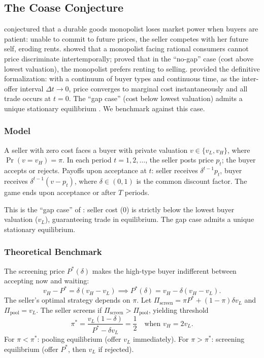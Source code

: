 \subsection{The Coase Conjecture}

\citet{coase1972durability} conjectured that a durable goods monopolist loses market power when buyers are patient: unable to commit to future prices, the seller competes with her future self, eroding rents. \citet{stokey1981rational} showed that a monopolist facing rational consumers cannot price discriminate intertemporally; \citet{bulow1982durable} proved that in the ``no-gap'' case (cost above lowest valuation), the monopolist prefers renting to selling. \citet{gul1986foundations} provided the definitive formalization: with a continuum of buyer types and continuous time, as the inter-offer interval $\Delta t \to 0$, price converges to marginal cost instantaneously and all trade occurs at $t = 0$. The ``gap case'' (cost below lowest valuation) admits a unique stationary equilibrium \citep{ausubel1989reputation, ausubel2002bargaining}. We benchmark against this case.

\subsubsection{Model}

A seller with zero cost faces a buyer with private valuation $v \in \{v_L, v_H\}$, where $\Pr(v = v_H) = \pi$. In each period $t = 1, 2, \ldots$, the seller posts price $p_t$; the buyer accepts or rejects. Payoffs upon acceptance at $t$: seller receives $\delta^{t-1} p_t$, buyer receives $\delta^{t-1}(v - p_t)$, where $\delta \in (0,1)$ is the common discount factor. The game ends upon acceptance or after $T$ periods.

This is the ``gap case'' of \citet{ausubel2002bargaining}: seller cost (0) is strictly below the lowest buyer valuation ($v_L$), guaranteeing trade in equilibrium. The gap case admits a unique stationary equilibrium.

\subsubsection{Theoretical Benchmark}

The screening price $P^*(\delta)$ makes the high-type buyer indifferent between accepting now and waiting:
\begin{equation}
v_H - P^* = \delta(v_H - v_L) \implies P^*(\delta) = v_H - \delta(v_H - v_L).
\end{equation}
The seller's optimal strategy depends on $\pi$. Let $\Pi_{\text{screen}} = \pi P^* + (1-\pi)\delta v_L$ and $\Pi_{\text{pool}} = v_L$. The seller screens if $\Pi_{\text{screen}} > \Pi_{\text{pool}}$, yielding threshold
\begin{equation}
\pi^* = \frac{v_L(1-\delta)}{P^* - \delta v_L} = \frac{1}{2} \quad \text{when } v_H = 2v_L.
\end{equation}
For $\pi < \pi^*$: pooling equilibrium (offer $v_L$ immediately). For $\pi > \pi^*$: screening equilibrium (offer $P^*$, then $v_L$ if rejected).


